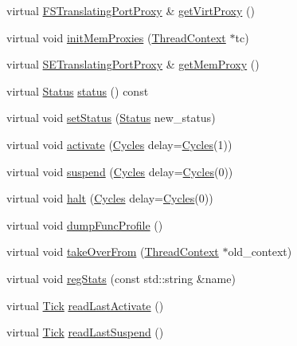 \begin{DoxyCompactItemize}
\item 
virtual \hyperlink{classFSTranslatingPortProxy}{FSTranslatingPortProxy} \& \hyperlink{classO3ThreadContext_a03a07ebd804051b18b69156c2fff36a3}{getVirtProxy} ()
\item 
virtual void \hyperlink{classO3ThreadContext_a2d4bc0eb5db970fb1647344ef772de61}{initMemProxies} (\hyperlink{classThreadContext}{ThreadContext} $\ast$tc)
\item 
virtual \hyperlink{classSETranslatingPortProxy}{SETranslatingPortProxy} \& \hyperlink{classO3ThreadContext_ae9d873744bcdc5b96477b0b31369de82}{getMemProxy} ()
\item 
virtual \hyperlink{classThreadContext_a67a0db04d321a74b7e7fcfd3f1a3f70b}{Status} \hyperlink{classO3ThreadContext_aac0de8e2cbe41c149f875d5b7ecba1d5}{status} () const 
\item 
virtual void \hyperlink{classO3ThreadContext_afd2e0894c5e6d90253525390acf6e6dd}{setStatus} (\hyperlink{classThreadContext_a67a0db04d321a74b7e7fcfd3f1a3f70b}{Status} new\_\-status)
\item 
virtual void \hyperlink{classO3ThreadContext_ab542a5cf9ce4b41042d61e42dfe3aeab}{activate} (\hyperlink{classCycles}{Cycles} delay=\hyperlink{classCycles}{Cycles}(1))
\item 
virtual void \hyperlink{classO3ThreadContext_a32072550286c5735b4b95349efa8e4f6}{suspend} (\hyperlink{classCycles}{Cycles} delay=\hyperlink{classCycles}{Cycles}(0))
\item 
virtual void \hyperlink{classO3ThreadContext_ade40686c5cdae8911d4062b9bf3d5340}{halt} (\hyperlink{classCycles}{Cycles} delay=\hyperlink{classCycles}{Cycles}(0))
\item 
virtual void \hyperlink{classO3ThreadContext_a13fa12d1779a94a1e0b968946a1367c7}{dumpFuncProfile} ()
\item 
virtual void \hyperlink{classO3ThreadContext_af121f4812cba8e37d675cddada8e47ed}{takeOverFrom} (\hyperlink{classThreadContext}{ThreadContext} $\ast$old\_\-context)
\item 
virtual void \hyperlink{classO3ThreadContext_a3dd3443357312bcb75580eaa508c48a4}{regStats} (const std::string \&name)
\item 
virtual \hyperlink{base_2types_8hh_a5c8ed81b7d238c9083e1037ba6d61643}{Tick} \hyperlink{classO3ThreadContext_afaa8f9eb8d809cccd31829ba793a433a}{readLastActivate} ()
\item 
virtual \hyperlink{base_2types_8hh_a5c8ed81b7d238c9083e1037ba6d61643}{Tick} \hyperlink{classO3ThreadContext_a7d0b0631c7087d361f6ae11379c06b15}{readLastSuspend} ()

\end{DoxyCompactItemize}
